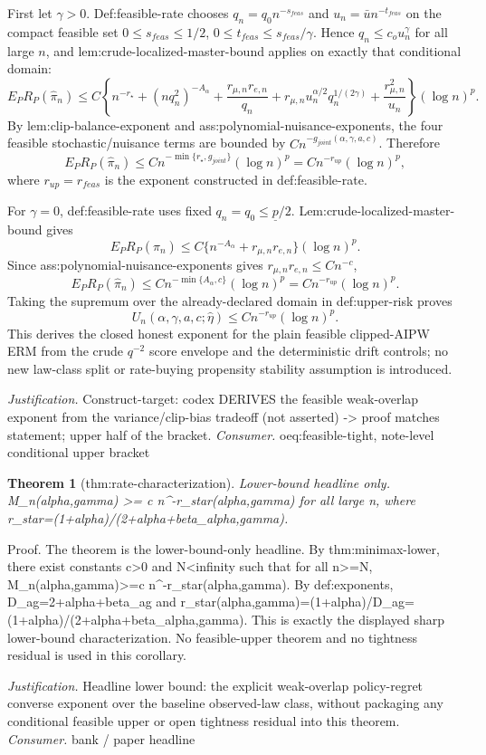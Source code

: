 \documentclass{article}
\newtheorem{theorem}{Theorem}
\begin{document}
First let \(\gamma>0\). Def:feasible-rate chooses \(q_n=q_0n^{-s_{feas}}\) and \(u_n=\bar u n^{-t_{feas}}\) on the compact feasible set \(0\le s_{feas}\le1/2\), \(0\le t_{feas}\le s_{feas}/\gamma\). Hence \(q_n\le c_ou_n^\gamma\) for all large \(n\), and lem:crude-localized-master-bound applies on exactly that conditional domain:
\[
E_PR_P(\widehat\pi_n)
\le C\left\{n^{-r_\star}+(nq_n^2)^{-A_\alpha}+\frac{r_{\mu,n}r_{e,n}}{q_n}+r_{\mu,n}u_n^{\alpha/2}q_n^{1/(2\gamma)}+\frac{r_{\mu,n}^2}{u_n}\right\}(\log n)^p.
\]
By lem:clip-balance-exponent and ass:polynomial-nuisance-exponents, the four feasible stochastic/nuisance terms are bounded by \(Cn^{-g_{joint}(\alpha,\gamma,a,c)}\). Therefore
\[
E_PR_P(\widehat\pi_n)
\le Cn^{-\min\{r_\star,g_{joint}\}}(\log n)^p
=Cn^{-r_{up}}(\log n)^p,
\]
where \(r_{up}=r_{feas}\) is the exponent constructed in def:feasible-rate.

For \(\gamma=0\), def:feasible-rate uses fixed \(q_n=q_0\le\underline p/2\). Lem:crude-localized-master-bound gives
\[
E_PR_P(\widehat\pi_n)\le C\{n^{-A_\alpha}+r_{\mu,n}r_{e,n}\}(\log n)^p.
\]
Since ass:polynomial-nuisance-exponents gives \(r_{\mu,n}r_{e,n}\le Cn^{-c}\),
\[
E_PR_P(\widehat\pi_n)\le Cn^{-\min\{A_\alpha,c\}}(\log n)^p=Cn^{-r_{up}}(\log n)^p.
\]
Taking the supremum over the already-declared domain in def:upper-risk proves
\[
U_n(\alpha,\gamma,a,c;\widehat\eta)\le Cn^{-r_{up}}(\log n)^p.
\]
This derives the closed honest exponent for the plain feasible clipped-AIPW ERM from the crude \(q^{-2}\) score envelope and the deterministic drift controls; no new law-class split or rate-buying propensity stability assumption is introduced.
\par\smallskip\noindent \textit{Justification.} Construct-target: codex DERIVES the feasible weak-overlap exponent from the variance/clip-bias tradeoff (not asserted) -> proof matches statement; upper half of the bracket. \textit{Consumer.} oeq:feasible-tight, note-level conditional upper bracket

\begin{theorem}[thm:rate-characterization]\label{thm:rate-characterization}
Lower-bound headline only. M_n(alpha,gamma) >= c n^{-r_star(alpha,gamma)} for all large n, where r_star=(1+alpha)/(2+alpha+beta_{alpha,gamma}).
\end{theorem}
Proof. The theorem is the lower-bound-only headline. By thm:minimax-lower, there exist constants c>0 and N<infinity such that for all n>=N, M_n(alpha,gamma)>=c n^{-r_star(alpha,gamma)}. By def:exponents, D_ag=2+alpha+beta_ag and r_star(alpha,gamma)=(1+alpha)/D_ag=(1+alpha)/(2+alpha+beta_{alpha,gamma}). This is exactly the displayed sharp lower-bound characterization. No feasible-upper theorem and no tightness residual is used in this corollary.
\par\smallskip\noindent \textit{Justification.} Headline lower bound: the explicit weak-overlap policy-regret converse exponent over the baseline observed-law class, without packaging any conditional feasible upper or open tightness residual into this theorem. \textit{Consumer.} bank / paper headline
\end{document}
